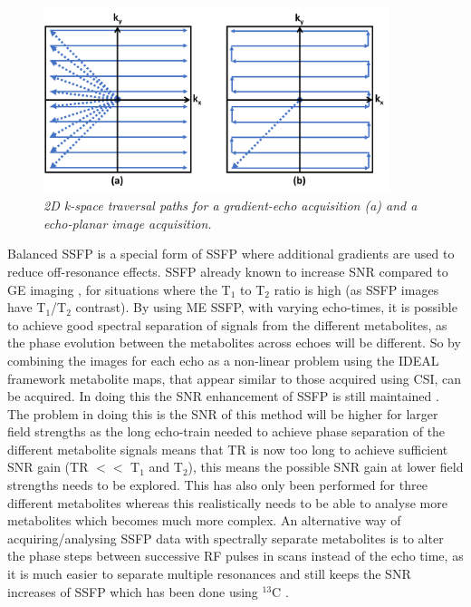 \begin{figure}
    \centering
    \includegraphics[width=0.9\textwidth]{Figures/Theory/kspace.png}
    \caption{\textit{2D k-space traversal paths for a gradient-echo acquisition (a) and a echo-planar image acquisition.}}
    \label{fig:theory:kspace}
\end{figure}

Balanced \ac{SSFP} \cite{Carr1954EffectsExperiments} is a special form of \ac{SSFP} where additional gradients are used to reduce off-resonance effects. \ac{SSFP} already known to increase \ac{SNR} compared to \ac{GE} imaging  \cite{Bieri2013FundamentalsMRI}, for situations where the T$_1$ to T$_2$ ratio is high (as \ac{SSFP} images have T$_1$/T$_2$ contrast). By using \ac{ME} \ac{SSFP}, with varying echo-times, it is possible to achieve good spectral separation of signals from the different metabolites, as the phase evolution between the metabolites across echoes will be different. So by combining the images for each echo as a non-linear problem using the IDEAL framework \cite{Reeder2007Water-fatImaging} metabolite maps, that appear similar to those acquired using \ac{CSI}, can be acquired. In doing this the \ac{SNR} enhancement of \ac{SSFP} is still maintained \cite{Peters2021ImprovingInvestigation}. The problem in doing this is the \ac{SNR} of this method will be higher for larger field strengths as the long echo-train needed to achieve phase separation of the different metabolite signals means that \ac{TR} is now too long to achieve sufficient \ac{SNR} gain (\ac{TR} $<<$ T$_1$ and T$_2$), this means the possible \ac{SNR} gain at lower field strengths needs to be explored. This has also only been performed for three different metabolites whereas this realistically needs to be able to analyse more metabolites which becomes much more complex. An alternative way of acquiring/analysing \ac{SSFP} data with spectrally separate metabolites is to alter the phase steps between successive \ac{RF} pulses in scans instead of the echo time, as it is much easier to separate multiple resonances and still keeps the \ac{SNR} increases of \ac{SSFP} which has been done using $^{13}$C \cite{Varma2016SelectiveSSFP}.

